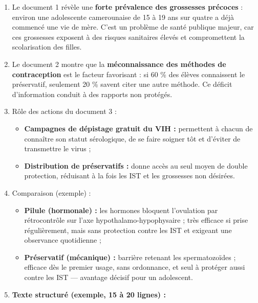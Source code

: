 \documentclass[11pt]{article}
\begin{document}
\begin{corrige}
\begin{enumerate}
\item Le document 1 révèle une \textbf{forte prévalence des grossesses précoces} : environ une adolescente camerounaise de 15 à 19 ans sur quatre a déjà commencé une vie de mère. C'est un problème de santé publique majeur, car ces grossesses exposent à des risques sanitaires élevés et compromettent la scolarisation des filles.
\item Le document 2 montre que la \textbf{méconnaissance des méthodes de contraception} est le facteur favorisant : si 60 \% des élèves connaissent le préservatif, seulement 20 \% savent citer une autre méthode. Ce déficit d'information conduit à des rapports non protégés.
\item Rôle des actions du document 3 :
\begin{itemize}
\item \textbf{Campagnes de dépistage gratuit du VIH :} permettent à chacun de connaître son statut sérologique, de se faire soigner tôt et d'éviter de transmettre le virus ;
\item \textbf{Distribution de préservatifs :} donne accès au seul moyen de double protection, réduisant à la fois les IST et les grossesses non désirées.
\end{itemize}
\item Comparaison (exemple) :
\begin{itemize}
\item \textbf{Pilule (hormonale) :} les hormones bloquent l'ovulation par rétrocontrôle sur l'axe hypothalamo-hypophysaire ; très efficace si prise régulièrement, mais sans protection contre les IST et exigeant une observance quotidienne ;
\item \textbf{Préservatif (mécanique) :} barrière retenant les spermatozoïdes ; efficace dès le premier usage, sans ordonnance, et seul à protéger aussi contre les IST — avantage décisif pour un adolescent.
\end{itemize}
\item \textbf{Texte structuré (exemple, 15 à 20 lignes) :}


\end{enumerate}
\end{corrige}
\end{document}
